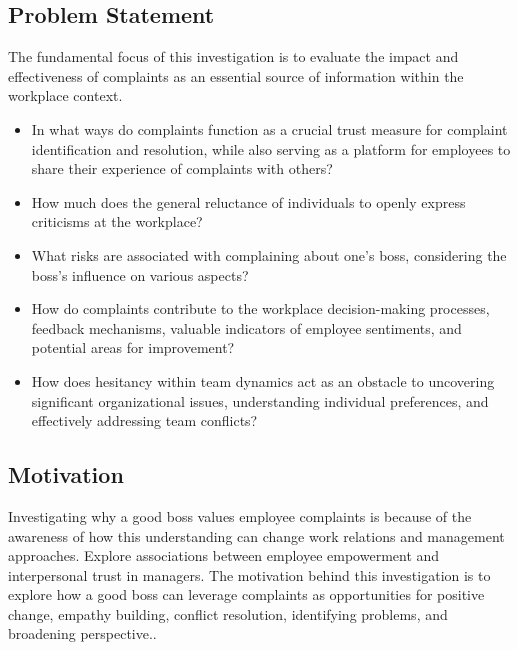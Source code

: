 \documentclass[a4paper,12pt]{article}
\begin{document}
\subsection{Problem Statement}
The fundamental focus of this investigation is to evaluate the impact and effectiveness of complaints as an essential source of information within the workplace context. 
\begin{itemize}
    \item In what ways do complaints function as a crucial trust measure for complaint identification and resolution, while also serving as a platform for employees to share their experience of complaints with others?\cite{employee_manager}
    \item How much does the general reluctance of individuals to openly express criticisms at the workplace?
    \item What risks are associated with complaining about one's boss, considering the boss's influence on various aspects?\cite{complain_boss}
    \item How do complaints contribute to the workplace decision-making processes, feedback mechanisms, valuable indicators of employee sentiments, and potential areas for improvement?
    \item How does hesitancy within team dynamics act as an obstacle to uncovering significant organizational issues, understanding individual preferences, and effectively addressing team conflicts?\cite{employee_silence}
\end{itemize}


\subsection{Motivation}
Investigating why a good boss values employee complaints is because of the awareness of how this understanding can change work relations and management approaches. Explore associations between employee empowerment and interpersonal trust in managers\cite{employee_manager}. The motivation behind this investigation is to explore how a good boss can leverage complaints as opportunities for positive change, empathy building, conflict resolution, identifying problems, and broadening perspective.\cite{complain_boss}.    
\end{document}
